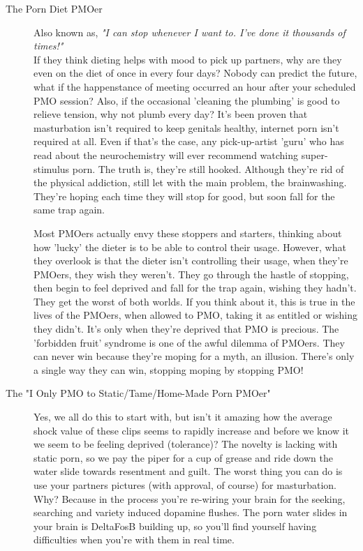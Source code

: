 \documentclass[easypeasy]{subfiles}
\begin{document}
\begin{description}
    \item [The Porn Diet PMOer] Also known as, \textit{"I can stop whenever I want to. I've done it thousands of times!"}\\ If they think dieting helps with mood to pick up partners, why are they even on the diet of once in every four days? Nobody can predict the future, what if the happenstance of meeting occurred an hour after your scheduled PMO session? Also, if the occasional 'cleaning the plumbing' is good to relieve tension, why not plumb every day? It's been proven that masturbation isn't required to keep genitals healthy, internet porn isn't required at all. Even if that's the case, any pick-up-artist 'guru' who has read about the neurochemistry will ever recommend watching super-stimulus porn. The truth is, they're still hooked. Although they're rid of the physical addiction, still let with the main problem, the brainwashing. They're hoping each time they will stop for good, but soon fall for the same trap again.

  Most PMOers actually envy these stoppers and starters, thinking about how 'lucky' the dieter is to be able to control their usage. However, what they overlook is that the dieter isn't controlling their usage, when they're PMOers, they wish they weren't. They go through the hastle of stopping, then begin to feel deprived and fall for the trap again, wishing they hadn't. They get the worst of both worlds. If you think about it, this is true in the lives of the PMOers, when allowed to PMO, taking it as entitled or wishing they didn't. It's only when they're deprived that PMO is precious. The 'forbidden fruit' syndrome is one of the awful dilemma of PMOers. They can never win because they're moping for a myth, an illusion. There's only a single way they can win, stopping moping by stopping PMO!

\item [The "I Only PMO to Static/Tame/Home-Made Porn PMOer"] Yes, we all do this to start with, but isn't it amazing how the average shock value of these clips seems to rapidly increase and before we know it we seem to be feeling deprived (tolerance)? The novelty is lacking with static porn, so we pay the piper for a cup of grease and ride down the water slide towards resentment and guilt. The worst thing you can do is use your partners pictures (with approval, of course) for masturbation. Why? Because in the process you're re-wiring your brain for the seeking, searching and variety induced dopamine flushes. The porn water slides in your brain is DeltaFosB building up, so you'll find yourself having difficulties when you're with them in real time.


\end{description}
\end{document}
